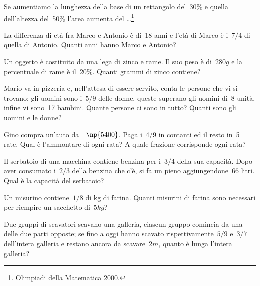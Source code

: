 \begin{multicols}{2}
\begin{esercizio}[\Ast]%
Se aumentiamo la lunghezza della base di un rettangolo del~30\% e quella dell'altezza del~50\% l'area aumenta del \ldots \footnote{Olimpiadi della Matematica 2000.}
\end{esercizio}

\begin{esercizio}[\Ast]%
 La differenza di età fra Marco e Antonio è di~18 anni e
l'età di Marco è i~$7/4$ di quella di Antonio. Quanti
anni hanno Marco e Antonio?
\end{esercizio}

\begin{esercizio}%
 Un oggetto è costituito da una lega di zinco e rame. Il suo peso
è di~$280\unit{g}$ e la percentuale di rame è il~20\%. Quanti grammi di zinco
contiene?
\end{esercizio}

\begin{esercizio}[\Ast]%
 Mario va in pizzeria e, nell'attesa di essere
servito, conta le persone che vi si trovano: gli uomini sono i~$5/9$
delle donne, queste superano gli uomini di~8 unità, infine vi sono~17
bambini. Quante persone ci sono in tutto? Quanti sono gli uomini e le
donne?
\end{esercizio}

\begin{esercizio}[\Ast]%
 Gino compra un'auto da~\officialeuro~$\np{5400}$. Paga i~4/9 in contanti ed il resto
in~5 rate. Qual è l'ammontare di ogni rata? A quale
frazione corrisponde ogni rata?
\end{esercizio}

\begin{esercizio}[\Ast]%
 Il serbatoio di una macchina contiene benzina per i~$3/4$ della sua
capacità. Dopo aver consumato i~$2/3$ della benzina che
c'è, si fa un pieno aggiungendone~66 litri. Qual è
la capacità del serbatoio?
\end{esercizio}

\begin{esercizio}%
 Un misurino contiene~$1/8$ di kg di farina. Quanti misurini di farina
sono necessari per riempire un sacchetto di~$5\unit{kg}$?
\end{esercizio}

\begin{esercizio}[\Ast]%
 Due gruppi di scavatori scavano una galleria, ciascun gruppo comincia
da una delle due parti opposte; se fino a oggi hanno scavato
rispettivamente~$5/9$ e~$3/7$ dell'intera galleria e
restano ancora da scavare~$2\unit{m}$, quanto è lunga
l'intera galleria?
\end{esercizio}


\end{multicols}
